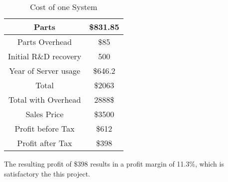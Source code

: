 \documentclass[ppfs.tex]{template/subfiles}
\begin{document}
        \begin{table}[h!]
        	\begin{center}
        		\caption{Cost of one System}
        		\begin{tabular}{|c|c|}
        			\hline
        			Parts & \$831.85\\
        			\hline
        			Parts Overhead & \$85\\
        			\hline
        			Initial R\&D recovery & 500\\
        			\hline
        			Year of Server usage & \$646.2\\
        			\hline
        			Total & \$2063\\
        			\hline
        			Total with Overhead & 2888\$\\
        			\hline
        			Sales Price& \$3500\\
        			\hline
        			Profit before Tax& \$612\\
        			\hline
        			Profit after Tax& \$398\\
        			\hline
        		\end{tabular}
        	\end{center}
        \end{table}
        
        The resulting profit of \$398 results in a profit margin of 11.3\%, which is satisfactory the this project.
        
        
\end{document}
